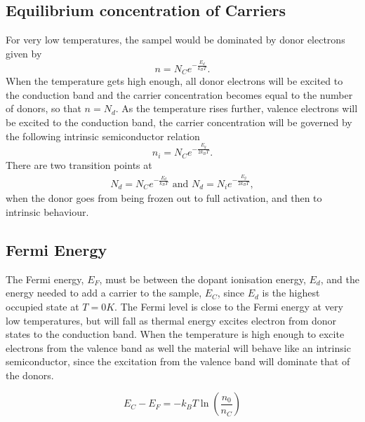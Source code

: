 \documentclass[11pt]{amsart}
\begin{document}
\subsection{Equilibrium concentration of Carriers}
For very low temperatures, the sampel would be dominated by donor electrons given by
\begin{equation}
n = N_C e^{-\frac{E_d}{k_B T}}.
\end{equation}
When the temperature gets high enough, all donor electrons will be excited to the conduction band and the carrier concentration becomes equal to the number of donors, so that $n=N_d$. As the temperature rises further, valence electrons will be excited to the conduction band, the carrier concentration will be governed by the following intrinsic semiconductor relation
\begin{equation}
n_i = N_C e^{-\frac{E_g}{2k_BT}}.
\end{equation}
There are two transition points at
\begin{align*}
N_d = N_Ce^{-\frac{E_d}{k_BT}} \text{ and } N_d = N_ie^{-\frac{E_g}{2k_BT}},
\end{align*}
when the donor goes from being frozen out to full activation, and then to intrinsic behaviour.

\subsection{Fermi Energy}
The Fermi energy, $E_F$, must be between the dopant ionisation energy, $E_d$, and the energy needed to add a carrier to the sample, $E_C$, since $E_d$ is the highest occupied state at $T = 0K$. The Fermi level is close to the Fermi energy at very low temperatures, but will fall as thermal energy excites electron from donor states to the conduction band. When the temperature is high enough to excite electrons from the valence band as well the material will behave like an intrinsic semiconductor, since the excitation from the valence band will dominate that of the donors.

\begin{equation}
E_C - E_F = -k_BT\ln\left(\frac{n_0}{n_C}\right)
\end{equation}
\end{document}
